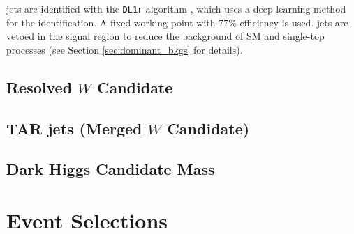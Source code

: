 \subsubsection*{\btag}
\btagged jets are identified with the \verb|DL1r| algorithm \cite{ATLAS-CONF-2018-006}, which uses a deep learning method for the identification. A fixed working point with 77\% efficiency is used. \btagged jets are vetoed in the signal region to reduce the background of SM \ttbar and single-top processes (see Section \ref{sec:dominant_bkgs} for details).

\subsection{Resolved \(W\) Candidate}
\label{sec:resolved_w_cand}

\subsection{TAR jets (Merged \(W\) Candidate)}


\subsection{\met}
\subsection{Dark Higgs Candidate Mass}

\section{Event Selections}
\label{sec:evt_selections}

